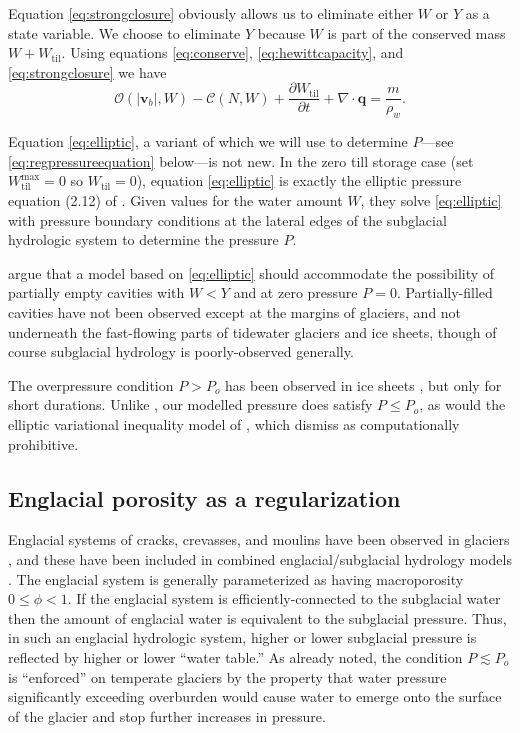 \documentclass[gmd]{copernicus}   %
\newcommand{\text}{\textrm}
\newcommand\bv{\mathbf{v}}
\newcommand\bq{\mathbf{q}}
\newcommand{\ddt}[1]{\ensuremath{\frac{\partial #1}{\partial t}}}
\newcommand{\Div}{\nabla\cdot}
\newcommand{\Wtil}{W_{\text{til}}}
\newcommand{\Wtilmax}{W_{\text{til}}^{\text{max}}}
\begin{document}
Equation \eqref{eq:strongclosure} obviously allows us to eliminate either $W$ or $Y$ as a state variable.  We choose to eliminate $Y$ because $W$ is part of the conserved mass $W + \Wtil$.  Using equations \eqref{eq:conserve}, \eqref{eq:hewittcapacity}, and \eqref{eq:strongclosure} we have
\begin{equation}
\mathcal{O}(|\bv_b|,W) - \mathcal{C}(N,W) + \ddt{\Wtil} + \Div\bq = \frac{m}{\rho_w}. \label{eq:elliptic}
\end{equation}

Equation \eqref{eq:elliptic}, a variant of which we will use to determine $P$---see \eqref{eq:regpressureequation} below---is not new.  In the zero till storage case (set $\Wtilmax=0$ so $\Wtil=0$), equation \eqref{eq:elliptic} is exactly the elliptic pressure equation (2.12) of \cite{Schoofetal2012}.  Given values for the water amount $W$, they solve \eqref{eq:elliptic} with pressure boundary conditions at the lateral edges of the subglacial hydrologic system to determine the pressure $P$.

\cite{Schoofetal2012} argue that a model based on \eqref{eq:elliptic} should accommodate the possibility of partially empty cavities with $W<Y$ and at zero pressure $P=0$.  Partially-filled cavities have not been observed except at the margins of glaciers, and not underneath the fast-flowing parts of tidewater glaciers and ice sheets, though of course subglacial hydrology is poorly-observed generally.

The overpressure condition $P>P_o$ has been observed in ice sheets \citep[for example]{Dasetal08}, but only for short durations.  Unlike \cite{Werderetal2013}, our modelled pressure does satisfy $P\le P_o$, as would the elliptic variational inequality model of \cite{Schoofetal2012}, which \cite{Werderetal2013} dismiss as computationally prohibitive. 

\subsection{Englacial porosity as a regularization}  Englacial systems of cracks, crevasses, and moulins have been observed in glaciers \citep[for example]{Bartholomausetal2008,Harperetal2010}, and these have been included in combined englacial/subglacial hydrology models \citep{FlowersClarke2002_theory,Bartholomausetal2011,Hewitt2013,Werderetal2013}.  The englacial system is generally parameterized as having macroporosity $0\le \phi < 1$.  If the englacial system is efficiently-connected to the subglacial water then the amount of englacial water is equivalent to the subglacial pressure.  Thus, in such an englacial hydrologic system, higher or lower subglacial pressure is reflected by higher or lower ``water table.''  As already noted, the condition $P\lesssim P_o$ is ``enforced'' on temperate glaciers by the property that water pressure significantly exceeding overburden would cause water to emerge onto the surface of the glacier and stop further increases in pressure.
\end{document}
